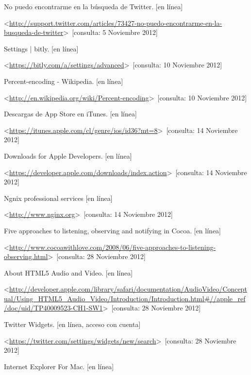 \begin{thebibliography}{99}
\begin{sloppypar}
%
No puedo encontrarme en la búsqueda de Twitter. [en línea]

\textless \url{http://support.twitter.com/articles/73427-no-puedo-encontrarme-en-la-busqueda-de-twitter}\textgreater \ [consulta: 5 Noviembre 2012] 

%
Settings | bitly. [en línea]\

\textless \url{https://bitly.com/a/settings/advanced}\textgreater \ [consulta: 10 Noviembre 2012] 

%
Percent-encoding - Wikipedia. [en línea]\

\textless \url{http://en.wikipedia.org/wiki/Percent-encoding}\textgreater \ [consulta: 10 Noviembre 2012] 

%
Descargas de App Store en iTunes. [en línea]\

\textless \url{https://itunes.apple.com/cl/genre/ios/id36?mt=8}\textgreater \ [consulta: 14 Noviembre 2012] 

%
Downloads for Apple Developers. [en línea]\

\textless \url{https://developer.apple.com/downloads/index.action}\textgreater \ [consulta: 14 Noviembre 2012]

%
Ngnix professional services [en línea]\

\textless \url{http://www.nginx.org}\textgreater \ [consulta: 14 Noviembre 2012]

%
Five approaches to listening, observing and notifying in Cocoa. [en línea]\

\textless \url{http://www.cocoawithlove.com/2008/06/five-approaches-to-listening-observing.html}\textgreater \ [consulta: 28 Noviembre 2012]

%
About HTML5 Audio and Video. [en línea]\

\textless \url{http://developer.apple.com/library/safari/documentation/AudioVideo/Conceptual/Using_HTML5_Audio_Video/Introduction/Introduction.html\#//apple_ref/doc/uid/TP40009523-CH1-SW1}\textgreater \ [consulta: 28 Noviembre 2012]

%
Twitter Widgets. [en línea, acceso con cuenta]\

\textless \url{https://twitter.com/settings/widgets/new/search}\textgreater \ [consulta: 28 Noviembre 2012]

%
Internet Explorer For Mac. [en línea]\


\end{sloppypar}
\end{thebibliography}
